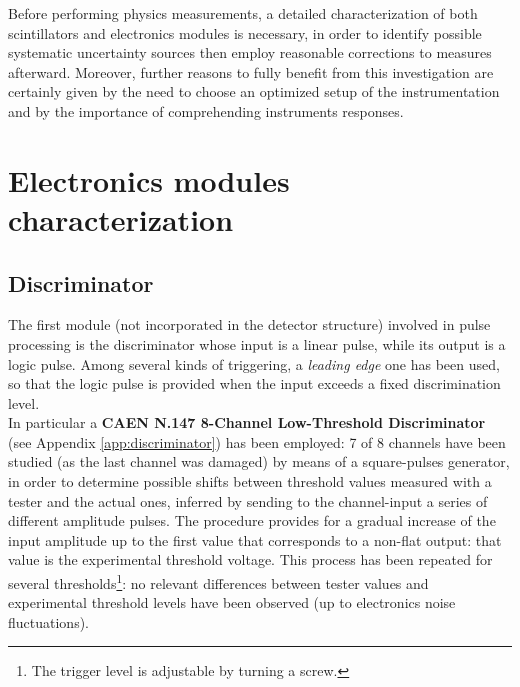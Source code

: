 Before performing physics measurements, a detailed characterization of both scintillators and electronics modules is necessary, in order to identify possible systematic uncertainty sources then employ reasonable corrections to measures afterward. Moreover, further reasons to fully benefit from this investigation are certainly given by the need to choose an optimized setup of the instrumentation and by the importance of comprehending instruments responses.

\section{Electronics modules characterization}
\subsection{Discriminator} \label{discriminator}
The first module (not incorporated in the detector structure) involved in pulse processing is the discriminator whose input is a linear pulse, while its output is a logic pulse. Among several kinds of triggering, a \emph{leading edge} one has been used, so that the logic pulse is provided when the input exceeds a fixed discrimination level.\\

In particular a \textbf{CAEN N.147 8-Channel Low-Threshold Discriminator} (see Appendix \ref{app:discriminator}) has been employed: 7 of 8 channels have been studied (as the last channel was damaged) by means of a square-pulses generator, in order to determine possible shifts between threshold values measured with a tester and the actual ones, inferred by sending to the channel-input a series of different amplitude pulses. The procedure provides for a gradual increase of the input amplitude up to the first value that corresponds to a non-flat output: that value is the experimental threshold voltage. This process has been repeated for several thresholds\footnote{The trigger level is adjustable by turning a screw.}: no relevant differences between tester values and experimental threshold levels have been observed (up to electronics noise fluctuations).\\

